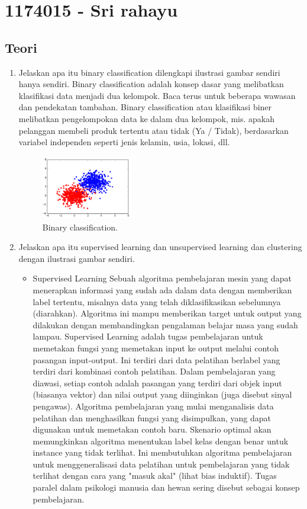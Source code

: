 \section{1174015 - Sri rahayu}
\subsection{Teori}
\begin{enumerate}

	\item Jelaskan apa itu binary classification dilengkapi ilustrasi gambar sendiri hanya sendiri.
	\hfill\break
	Binary classification adalah konsep dasar yang melibatkan klasifikasi data menjadi dua kelompok. Baca terus untuk beberapa wawasan dan pendekatan tambahan. Binary classification atau klasifikasi biner melibatkan pengelompokan data ke dalam dua kelompok, mis. apakah pelanggan membeli produk tertentu atau tidak (Ya / Tidak), berdasarkan variabel independen seperti jenis kelamin, usia, lokasi, dll.

	\begin{figure}[H]
	\centering
		\includegraphics[width=4cm]{figures/1174015/tugas2/materi/1.png}
		\caption{Binary classification.}
	\end{figure}

	\item Jelaskan apa itu supervised learning dan unsupervised learning dan clustering dengan ilustrasi gambar sendiri.
	\hfill\break

	\begin{itemize}
		\item Supervised Learning
		\hfill\break
		Sebuah algoritma pembelajaran mesin yang dapat menerapkan informasi yang sudah ada dalam data dengan memberikan label tertentu, misalnya data yang telah diklasifikasikan sebelumnya (diarahkan). Algoritma ini mampu memberikan target untuk output yang dilakukan dengan membandingkan pengalaman belajar masa yang sudah lampau. Supervised Learning adalah tugas pembelajaran untuk memetakan fungsi yang memetakan input ke output melalui contoh pasangan input-output. Ini terdiri dari data pelatihan berlabel yang terdiri dari kombinasi contoh pelatihan. Dalam pembelajaran yang diawasi, setiap contoh adalah pasangan yang terdiri dari objek input (biasanya vektor) dan nilai output yang diinginkan (juga disebut sinyal pengawas). Algoritma pembelajaran yang mulai menganalisis data pelatihan dan menghasilkan fungsi yang disimpulkan, yang dapat digunakan untuk memetakan contoh baru. Skenario optimal akan memungkinkan algoritma menentukan label kelas dengan benar untuk instance yang tidak terlihat. Ini membutuhkan algoritma pembelajaran untuk menggeneralisasi data pelatihan untuk pembelajaran yang tidak terlihat dengan cara yang "masuk akal" (lihat bias induktif). Tugas paralel dalam psikologi manusia dan hewan sering disebut sebagai konsep pembelajaran.


\end{itemize}
\end{enumerate}
